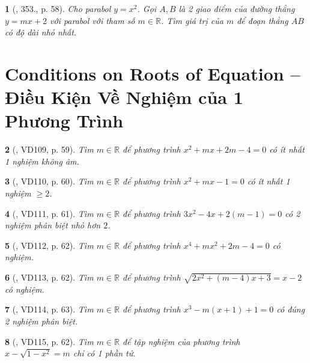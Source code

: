 \documentclass{article}
\newtheorem{baitoan}{}
\begin{document}
\begin{baitoan}[\cite{Binh_Toan_9_tap_2}, 353., p. 58]
	Cho parabol $y = x^2$. Gọi $A,B$ là 2 giao điểm của đường thẳng $y = mx + 2$ với parabol với tham số $m\in\mathbb{R}$. Tìm giá trị của $m$ để đoạn thẳng $AB$ có độ dài nhỏ nhất.
\end{baitoan}


\section{Conditions on Roots of Equation -- Điều Kiện Về Nghiệm của 1 Phương Trình}

\begin{baitoan}[\cite{Binh_Toan_9_tap_2}, VD109, p. 59]
	Tìm $m\in\mathbb{R}$ để phương trình $x^2 + mx + 2m - 4 = 0$ có ít nhất 1 nghiệm không âm.
\end{baitoan}

\begin{baitoan}[\cite{Binh_Toan_9_tap_2}, VD110, p. 60]
	Tìm $m\in\mathbb{R}$ để phương trình $x^2 + mx - 1 = 0$ có ít nhất 1 nghiệm $\ge2$.
\end{baitoan}

\begin{baitoan}[\cite{Binh_Toan_9_tap_2}, VD111, p. 61]
	Tìm $m\in\mathbb{R}$ để phương trình $3x^2 - 4x + 2(m - 1) = 0$ có 2 nghiệm phân biệt nhỏ hơn $2$.
\end{baitoan}

\begin{baitoan}[\cite{Binh_Toan_9_tap_2}, VD112, p. 62]
	Tìm $m\in\mathbb{R}$ để phương trình $x^4 + mx^2 + 2m - 4 = 0$ có nghiệm.
\end{baitoan}

\begin{baitoan}[\cite{Binh_Toan_9_tap_2}, VD113, p. 62]
	Tìm $m\in\mathbb{R}$ để phương trình $\sqrt{2x^2 + (m - 4)x + 3} = x - 2$ có nghiệm.
\end{baitoan}

\begin{baitoan}[\cite{Binh_Toan_9_tap_2}, VD114, p. 63]
	Tìm $m\in\mathbb{R}$ để phương trình $x^3 - m(x + 1) + 1 = 0$ có đúng 2 nghiệm phân biệt.
\end{baitoan}

\begin{baitoan}[\cite{Binh_Toan_9_tap_2}, VD115, p. 62]
	Tìm $m\in\mathbb{R}$ để tập nghiệm của phương trình $x - \sqrt{1 - x^2} = m$ chỉ có 1 phần tử.
\end{baitoan}
\end{document}
